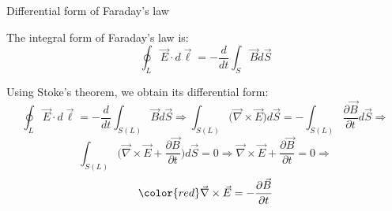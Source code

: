 \begin{frame}{Differential form of Faraday's law}

The integral form of Faraday's law is:
\begin{equation*}
   \oint_{L} \vec{E} \cdot d\vec{\ell} = - \frac{d}{dt} \int_{S} \vec{B} d\vec{S}
\end{equation*}

Using Stoke's theorem, we obtain its differential form:
\begin{equation*}
   \oint_{L} \vec{E} \cdot d\vec{\ell} = - \frac{d}{dt} \int_{S(L)} \vec{B} d\vec{S} \Rightarrow
   \int_{S(L)} \Big( \vec{\nabla} \times \vec{E} \Big) d\vec{S} = - \int_{S(L)} \frac{\partial \vec{B}}{\partial t} d\vec{S} \Rightarrow
\end{equation*}
\begin{equation*}
   \int_{S(L)} \Big( \vec{\nabla} \times \vec{E} + \frac{\partial \vec{B}}{\partial t} \Big) d\vec{S} = 0  \Rightarrow
   \vec{\nabla} \times \vec{E} + \frac{\partial \vec{B}}{\partial t} = 0 \Rightarrow
\end{equation*}
\begin{equation*}
{\color{red}
   \vec{\nabla} \times \vec{E} = - \frac{\partial \vec{B}}{\partial t}
}
\end{equation*}

\end{frame}



%
%

